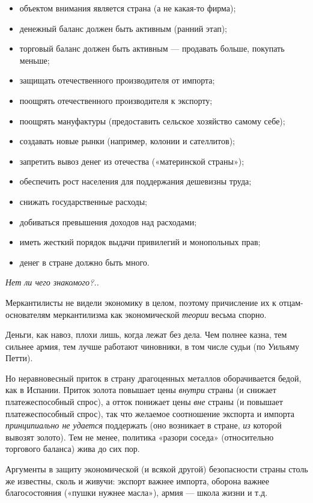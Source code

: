 \begin{itemize}
\item объектом внимания является страна (а не какая-то фирма);
\item денежный баланс должен быть активным (ранний этап);
\item торговый баланс должен быть активным — продавать больше, покупать меньше;
\item защищать отечественного производителя от импорта;
\item поощрять отечественного производителя к экспорту;
\item поощрять мануфактуры (предоставить сельское хозяйство самому себе);
\item создавать новые рынки (например, колонии и сателлитов);
\item запретить вывоз денег из отечества («материнской страны»);
\item обеспечить рост населения для поддержания дешевизны труда;
\item снижать государственные расходы;
\item добиваться превышения доходов над расходами;
\item иметь жесткий порядок выдачи привилегий и монопольных прав;
\item денег в стране должно быть много.
\end{itemize}
{\itshape
Нет ли чего знакомого?..}

Меркантилисты не видели экономику в целом, поэтому причисление их к отцам-основателям меркантилизма как экономической
\textit{теории} весьма спорно.

Деньги, как навоз, плохи лишь, когда лежат без дела. Чем полнее казна, тем сильнее армия, тем лучше работают чиновники,
в том числе судьи (по Уильяму Петти).

Но неравновесный приток в страну драгоценных металлов оборачивается бедой, как в Испании. Приток золота повышает цены
\textit{внутри} страны (и снижает платежеспособный спрос), а отток понижает цены \textit{вне} страны (и повышает
платежеспособный спрос), так что желаемое соотношение экспорта и импорта \textit{принципиально не удается} поддержать
(оно возникает в стране, \textit{из} которой вывозят золото). Тем не менее, политика «разори соседа» (относительно
торгового баланса) жива до сих пор.

Аргументы в защиту экономической (и всякой другой) безопасности страны столь же известны, сколь и живучи: экспорт важнее
импорта, оборона важнее благосостояния («пушки нужнее масла»), армия — школа жизни и т.д.

